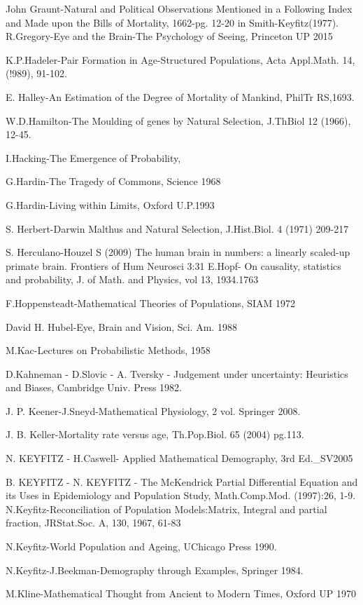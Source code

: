 John Graunt-Natural and Political Observations Mentioned in a Following Index and Made upon the Bills of Mortality, 1662-pg. 12-20 in Smith-Keyfitz(1977). R.Gregory-Eye and the Brain-The Psychology of Seeing, Princeton UP 2015 

K.P.Hadeler-Pair Formation in Age-Structured Populations, Acta Appl.Math. 14, (!989), 91-102. 

E. Halley-An Estimation of the Degree of Mortality of Mankind, PhilTr RS,1693. 

W.D.Hamilton-The Moulding of genes by Natural Selection, J.ThBiol 12 (1966), 12-45. 

I.Hacking-The Emergence of Probability, 

G.Hardin-The Tragedy of Commons, Science 1968 

G.Hardin-Living within Limits, Oxford U.P.1993

S. Herbert-Darwin Malthus and Natural Selection, J.Hist.Biol. 4 (1971) 209-217 

S. Herculano-Houzel S (2009) The human brain in numbers: a linearly scaled-up primate brain. Frontiers of Hum Neurosci 3:31 
E.Hopf- On causality, statistics and probability, J. of Math. and Physics, vol 13, 1934.1763 

F.Hoppensteadt-Mathematical Theories of Populations, SIAM 1972 

David H. Hubel-Eye, Brain and Vision, Sci. Am. 1988 

M.Kac-Lectures on Probabilistic Methods, 1958 

D.Kahneman - D.Slovic - A. Tversky - Judgement under uncertainty: Heuristics and Biases, Cambridge Univ. Press 1982. 

J. P. Keener-J.Sneyd-Mathematical Physiology, 2 vol. Springer 2008. 

J. B. Keller-Mortality rate versus age, Th.Pop.Biol. 65 (2004) pg.113. 

N. KEYFITZ - H.Caswell- Applied Mathematical Demography, 3rd Ed.\_SV2005 

B. KEYFITZ - N. KEYFITZ - The McKendrick Partial Differential Equation and its Uses in Epidemiology and Population Study, Math.Comp.Mod. (1997):26, 1-9. 
N.Keyfitz-Reconciliation of Population Models:Matrix, Integral and partial fraction, JRStat.Soc. A, 130, 1967, 61-83 

N.Keyfitz-World Population and Ageing, UChicago Press 1990. 

N.Keyfitz-J.Beekman-Demography through Examples, Springer 1984. 

M.Kline-Mathematical Thought from Ancient to Modern Times, Oxford UP 1970 

